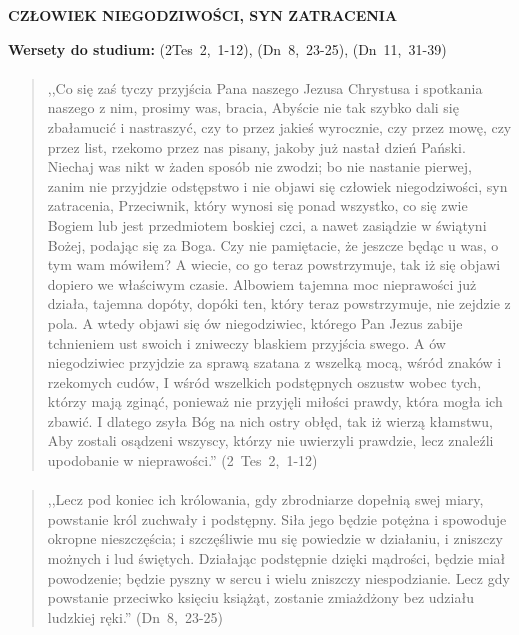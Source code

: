\documentclass[10pt,a4paper,oneside]{article}
\begin{document}
\centerline{\textbf{\MakeUppercase{Człowiek niegodziwości, syn zatracenia}}}
\begin{center}
\textbf{Wersety do studium:} 
\mbox{(2Tes 2, 1-12)}, \mbox{(Dn 8, 23-25)}, \mbox{(Dn 11, 31-39)}
\end{center}
\paragraph{}
\begin{quote}
,,Co się zaś tyczy przyjścia Pana naszego Jezusa Chrystusa i spotkania naszego z nim, prosimy was, bracia, Abyście nie tak szybko dali się zbałamucić i nastraszyć, czy to przez jakieś wyrocznie, czy przez mowę, czy przez list, rzekomo przez nas pisany, jakoby już nastał dzień Pański. Niechaj was nikt w żaden sposób nie zwodzi; bo nie nastanie pierwej, zanim nie przyjdzie odstępstwo i nie objawi się człowiek niegodziwości, syn zatracenia, Przeciwnik, który wynosi się ponad wszystko, co się zwie Bogiem lub jest przedmiotem boskiej czci, a nawet zasiądzie w świątyni Bożej, podając się za Boga. Czy nie pamiętacie, że jeszcze będąc u was, o tym wam mówiłem? A wiecie, co go teraz powstrzymuje, tak iż się objawi dopiero we właściwym czasie. Albowiem tajemna moc nieprawości już działa, tajemna dopóty, dopóki ten, który teraz powstrzymuje, nie zejdzie z pola. A wtedy objawi się ów niegodziwiec, którego Pan Jezus zabije tchnieniem ust swoich i zniweczy blaskiem przyjścia swego. A ów niegodziwiec przyjdzie za sprawą szatana z wszelką mocą, wśród znaków i rzekomych cudów, I wśród wszelkich podstępnych oszustw wobec tych, którzy mają zginąć, ponieważ nie przyjęli miłości prawdy, która mogła ich zbawić. I dlatego zsyła Bóg na nich ostry obłęd, tak iż wierzą kłamstwu, Aby zostali osądzeni wszyscy, którzy nie uwierzyli prawdzie, lecz znaleźli upodobanie w nieprawości.'' \mbox{(2 Tes 2, 1-12)}
\end{quote}
\paragraph{}
\begin{quote}
,,Lecz pod koniec ich królowania, gdy zbrodniarze dopełnią swej miary, powstanie król zuchwały i podstępny. Siła jego będzie potężna i spowoduje okropne nieszczęścia; i szczęśliwie mu się powiedzie w działaniu, i zniszczy możnych i lud świętych. Działając podstępnie dzięki mądrości, będzie miał powodzenie; będzie pyszny w sercu i wielu zniszczy niespodzianie. Lecz gdy powstanie przeciwko księciu książąt, zostanie zmiażdżony bez udziału ludzkiej ręki.'' \mbox{(Dn 8, 23-25)}
\end{quote}
\end{document}
